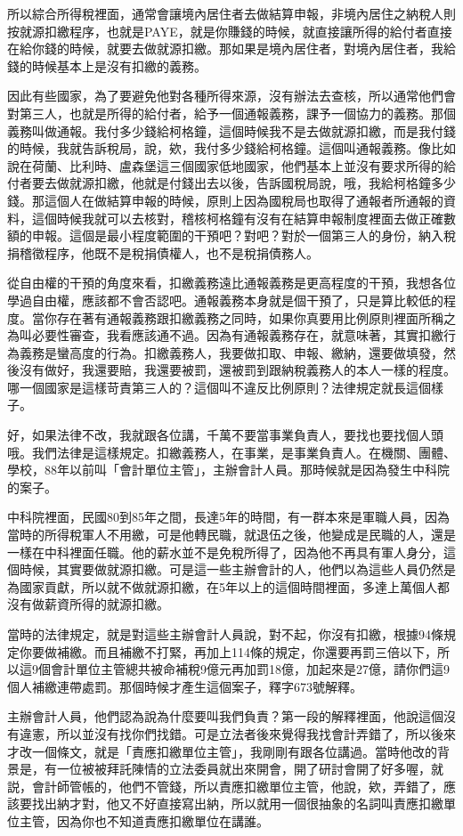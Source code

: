 \documentclass[oneside,sub3section]{ctexbook}
\begin{document}
所以綜合所得稅裡面，通常會讓境內居住者去做結算申報，非境內居住之納稅人則按就源扣繳程序，也就是PAYE，就是你賺錢的時候，就直接讓所得的給付者直接在給你錢的時候，就要去做就源扣繳。那如果是境內居住者，對境內居住者，我給錢的時候基本上是沒有扣繳的義務。

因此有些國家，為了要避免他對各種所得來源，沒有辦法去查核，所以通常他們會對第三人，也就是所得的給付者，給予一個通報義務，課予一個協力的義務。那個義務叫做通報。我付多少錢給柯格鐘，這個時候我不是去做就源扣繳，而是我付錢的時候，我就告訴稅局，說，欸，我付多少錢給柯格鐘。這個叫通報義務。像比如說在荷蘭、比利時、盧森堡這三個國家低地國家，他們基本上並沒有要求所得的給付者要去做就源扣繳，他就是付錢出去以後，告訴國稅局說，哦，我給柯格鐘多少錢。那這個人在做結算申報的時候，原則上因為國稅局也取得了通報者所通報的資料，這個時候我就可以去核對，稽核柯格鐘有沒有在結算申報制度裡面去做正確數額的申報。這個是最小程度範圍的干預吧？對吧？對於一個第三人的身份，納入稅捐稽徵程序，他既不是稅捐債權人，也不是稅捐債務人。

從自由權的干預的角度來看，扣繳義務遠比通報義務是更高程度的干預，我想各位學過自由權，應該都不會否認吧。通報義務本身就是個干預了，只是算比較低的程度。當你存在著有通報義務跟扣繳義務之同時，如果你真要用比例原則裡面所稱之為叫必要性審查，我看應該通不過。因為有通報義務存在，就意味著，其實扣繳行為義務是蠻高度的行為。扣繳義務人，我要做扣取、申報、繳納，還要做填發，然後沒有做好，我還要賠，我還要被罰，還被罰到跟納稅義務人的本人一樣的程度。哪一個國家是這樣苛責第三人的？這個叫不違反比例原則？法律規定就長這個樣子。

好，如果法律不改，我就跟各位講，千萬不要當事業負責人，要找也要找個人頭哦。我們法律是這樣規定。扣繳義務人，在事業，是事業負責人。在機關、團體、學校，88年以前叫「會計單位主管」，主辦會計人員。那時候就是因為發生中科院的案子。

中科院裡面，民國80到85年之間，長達5年的時間，有一群本來是軍職人員，因為當時的所得稅軍人不用繳，可是他轉民職，就退伍之後，他變成是民職的人，還是一樣在中科裡面任職。他的薪水並不是免稅所得了，因為他不再具有軍人身分，這個時候，其實要做就源扣繳。可是這一些主辦會計的人，他們以為這些人員仍然是為國家貢獻，所以就不做就源扣繳，在5年以上的這個時間裡面，多達上萬個人都沒有做薪資所得的就源扣繳。

當時的法律規定，就是對這些主辦會計人員說，對不起，你沒有扣繳，根據94條規定你要做補繳。而且補繳不打緊，再加上114條的規定，你還要再罰三倍以下，所以這9個會計單位主管總共被命補稅9億元再加罰18億，加起來是27億，請你們這9個人補繳連帶處罰。那個時候才產生這個案子，釋字673號解釋。

主辦會計人員，他們認為說為什麼要叫我們負責？第一段的解釋裡面，他說這個沒有違憲，所以並沒有找你們找錯。可是立法者後來覺得我找會計弄錯了，所以後來才改一個條文，就是「責應扣繳單位主管」，我剛剛有跟各位講過。當時他改的背景是，有一位被被拜託陳情的立法委員就出來開會，開了研討會開了好多喔，就説，會計師管帳的，他們不管錢，所以責應扣繳單位主管，他說，欸，弄錯了，應該要找出納才對，他又不好直接寫出納，所以就用一個很抽象的名詞叫責應扣繳單位主管，因為你也不知道責應扣繳單位在講誰。
\end{document}
